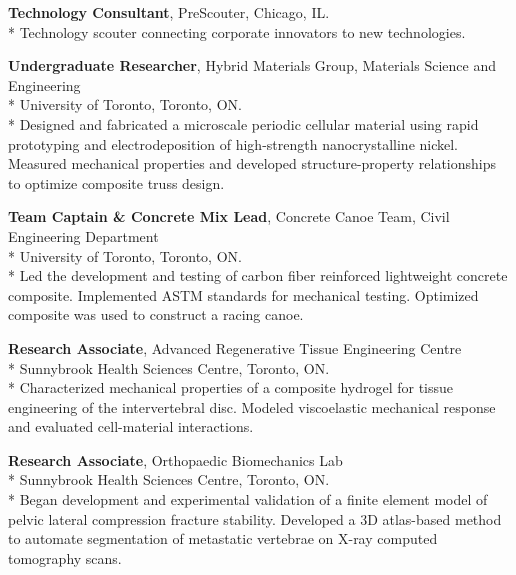 \textbf{Technology Consultant}, PreScouter, Chicago, IL.\\*
Technology scouter connecting corporate innovators to new technologies.  

\textbf{Undergraduate Researcher}, Hybrid Materials Group, Materials Science and Engineering\\* University of Toronto, Toronto, ON.\\*
Designed and fabricated a microscale periodic cellular material using rapid prototyping and electrodeposition of high-strength nanocrystalline nickel. Measured mechanical properties and developed structure-property relationships to optimize composite truss design.

\textbf{Team Captain \& Concrete Mix Lead}, Concrete Canoe Team, Civil Engineering Department\\* University of Toronto, Toronto, ON.\\*
Led the development and testing of carbon fiber reinforced lightweight concrete composite. Implemented ASTM standards for mechanical testing. Optimized composite was used to construct a racing canoe.

\textbf{Research Associate}, Advanced Regenerative Tissue Engineering Centre\\* Sunnybrook Health Sciences Centre, Toronto, ON.\\*
Characterized mechanical properties of a composite hydrogel for tissue engineering of the intervertebral disc. Modeled viscoelastic mechanical response and evaluated cell-material interactions.

\textbf{Research Associate}, Orthopaedic Biomechanics Lab\\* Sunnybrook Health Sciences Centre, Toronto, ON.\\*
Began development and experimental validation of a finite element model of pelvic lateral compression fracture stability. Developed a 3D atlas-based method to automate segmentation of metastatic vertebrae on X-ray computed tomography scans. 
\endgroup


